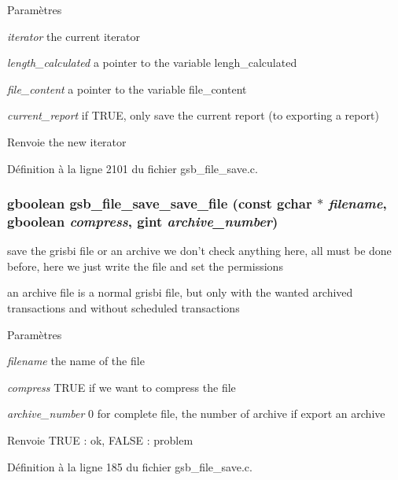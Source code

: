\begin{DoxyParams}{Paramètres}
\item[{\em iterator}]the current iterator \item[{\em length\_\-calculated}]a pointer to the variable lengh\_\-calculated \item[{\em file\_\-content}]a pointer to the variable file\_\-content \item[{\em current\_\-report}]if TRUE, only save the current report (to exporting a report)\end{DoxyParams}
\begin{DoxyReturn}{Renvoie}
the new iterator 
\end{DoxyReturn}


Définition à la ligne 2101 du fichier gsb\_\-file\_\-save.c.

\subsubsection[{gsb\_\-file\_\-save\_\-save\_\-file}]{\setlength{\rightskip}{0pt plus 5cm}gboolean gsb\_\-file\_\-save\_\-save\_\-file (const gchar $\ast$ {\em filename}, \/  gboolean {\em compress}, \/  gint {\em archive\_\-number})}\label{gsb__file__save_8c_a07b27e36f7166f5eae93c162039a78a7}
save the grisbi file or an archive we don't check anything here, all must be done before, here we just write the file and set the permissions

an archive file is a normal grisbi file, but only with the wanted archived transactions and without scheduled transactions


\begin{DoxyParams}{Paramètres}
\item[{\em filename}]the name of the file \item[{\em compress}]TRUE if we want to compress the file \item[{\em archive\_\-number}]0 for complete file, the number of archive if export an archive\end{DoxyParams}
\begin{DoxyReturn}{Renvoie}
TRUE : ok, FALSE : problem 
\end{DoxyReturn}


Définition à la ligne 185 du fichier gsb\_\-file\_\-save.c.

